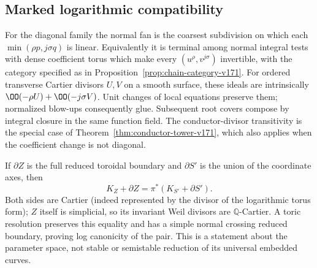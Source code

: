 \subsection{Marked logarithmic compatibility}
For the diagonal family the normal fan is the coarsest subdivision
on which each $\min(\rho p,j\sigma q)$ is linear. Equivalently it
is terminal among normal integral tests with dense coefficient torus
which make every $(u^\rho,v^{j\sigma})$ invertible, with the category
specified as in Proposition~\ref{prop:chain-category-v171}.
For ordered transverse Cartier divisors $U,V$ on a smooth surface,
these ideals are intrinsically
$\OO(-\rho U)+\OO(-j\sigma V)$. Unit changes of local equations
preserve them; normalized blow-ups consequently glue. Subsequent
root covers compose by integral closure in the same function field.
The conductor-divisor transitivity is the special case of
Theorem~\ref{thm:conductor-tower-v171}, which also applies when the
coefficient change is not diagonal.

If $\partial Z$ is the full reduced toroidal boundary and
$\partial S'$ is the union of the coordinate axes, then
\[
 K_Z+\partial Z=\pi^*(K_{S'}+\partial S').
\]
Both sides are Cartier (indeed represented by the divisor of the
logarithmic torus form); $Z$ itself is simplicial, so its invariant
Weil divisors are $\mathbb Q$-Cartier. A toric resolution preserves
this equality and has a simple normal crossing reduced boundary,
proving log canonicity of the pair. This is a statement about the
parameter space, not stable or semistable reduction of its universal
embedded curves.

